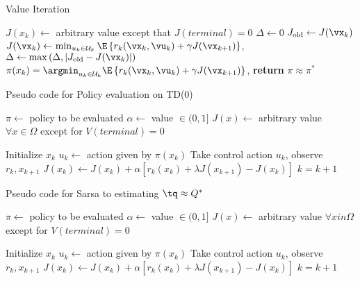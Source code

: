 \begin{algorithm}
  \caption{Value Iteration}\label{alg:VaI} %
\begin{algorithmic}

  \State $J(x_k) \gets $ arbitrary value except that $J(terminal) = 0$
  \While{$\Delta \ge  \theta$} 
    \State $\Delta \gets 0$
      \State $J_{\text{old}} \gets J(\vx_k)$
      \State $J(\vx_k) \gets \min_{u_k \in \mathcal{U}_k}\E \left\{ r_k(\vx_k,\vu_k) + \gamma J(\vx_{k+1}) \right\}$,
      \State $\Delta \gets \max \left(  \Delta,\left| J_{\text{old}} - J(\vx_k) \right| \right)$
    \EndFor
  \EndWhile 
  \State $\pi(x_k) = \argmin_{u_k \in \mathcal{U}_k}\E \left\{ r_k(\vx_k,\vu_k) + \gamma J(\vx_{k+1}) \right\}$,
 \State \textbf{return} $\pi \approx \pi^*$ 
\end{algorithmic}
\end{algorithm}



\begin{algorithm}%
  \caption{Pseudo code for Policy evaluation on TD(0)}\label{alg:TD(0)}
\begin{algorithmic}
\State $\pi \gets $ policy to be evaluated
\State $\alpha \gets $ value $\in (0,1]$
\State $J(x) \gets$ arbitrary value $\forall x \in \Omega$ except for $V(terminal) = 0$

  \State Initialize $x_k$
    \State $u_k \gets$ action given by $\pi(x_k)$
    \State Take control action $u_k$, observe $r_k, x_{k+1}$
    \State $J(x_k) \gets J(x_k) + \alpha[r_k(x_k) + \lambda J(x_{k+1}) - J(x_k)]$
    \State $k = k+1$
  \EndWhile
\EndLoop
\end{algorithmic}
\end{algorithm}




\begin{algorithm}%
  \caption{Pseudo code for Sarsa to estimating $\tq \approx Q^*$ }\label{alg:sarsa}
\begin{algorithmic}
\State $\pi \gets $ policy to be evaluated
\State $\alpha \gets $ value $\in (0,1]$
\State $J(x) \gets$ arbitrary value $\forall x in \Omega$ except for $V(terminal) = 0$

  \State Initialize $x_k$
    \State $u_k \gets$ action given by $\pi(x_k)$
    \State Take control action $u_k$, observe $r_k, x_{k+1}$
    \State $J(x_k) \gets J(x_k) + \alpha[r_k(x_k) + \lambda J(x_{k+1}) - J(x_k)]$
    \State $k = k+1$
  \EndWhile
\EndLoop
\end{algorithmic}
\end{algorithm}




